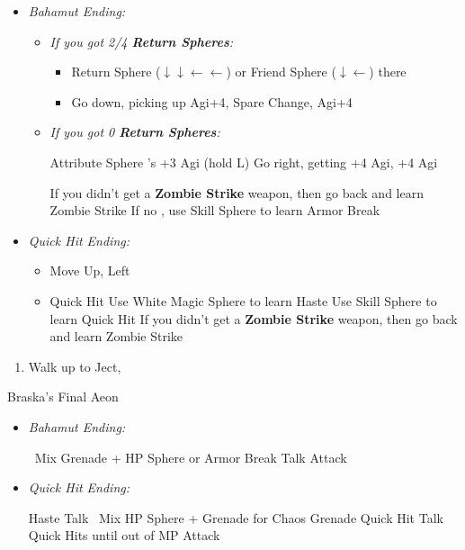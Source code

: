 \begin{spheregrid}
\begin{itemize}
	\item \textit{Bahamut Ending:}
	\begin{itemize}
		\item \textit{If you got 2/4 \textbf{Return Spheres}:}
		\begin{itemize}
			\yunaf Attribute Sphere \rikku's +3 Agi (hold L)
			\item Return Sphere ($\downarrow \downarrow \leftarrow \leftarrow$) or Friend Sphere ($\downarrow \leftarrow$) there
			\item Go down, picking up Agi+4, Spare Change, Agi+4
		\end{itemize}
		\item \textit{If you got 0 \textbf{Return Spheres}:}
		\begin{itemize}
			\yunaf Attribute Sphere \rikku's +3 Agi (hold L)
			\yunaf Go right, getting +4 Agi, +4 Agi
		\end{itemize}
		\tidusf If you didn't get a \textbf{Zombie Strike} weapon, then go back and learn Zombie Strike
		\rikkuf If no \od, use Skill Sphere to learn Armor Break
	\end{itemize}
	\item \textit{Quick Hit Ending:}
	\begin{itemize}
		\rikkuf Unlock Level 2 Key Sphere
		\item Move Up, Left
		\item Quick Hit
		\yunaf Use White Magic Sphere to learn Haste
		\yunaf Use Skill Sphere to learn Quick Hit
		\tidusf If you didn't get a \textbf{Zombie Strike} weapon, then go back and learn Zombie Strike
	\end{itemize}
\end{itemize}
\end{spheregrid}
\begin{enumerate}[resume]
	\item Walk up to Ject, \cs[4:30]
\end{enumerate}
\begin{battle}[180000]{Braska's Final Aeon}
\begin{itemize}
	\item \textit{Bahamut Ending:}
	\begin{itemize}
		\switch{\yuna}{\rikku}
		\rikkuf \od\ Mix Grenade + HP Sphere or Armor Break
		\tidusf Talk
		\switch{\auron}{\yuna}
		\summon{\bahamut}
		\bahamutf Attack
	\end{itemize}
	\item \textit{Quick Hit Ending:}
	\begin{itemize}
		\yunaf Haste \yuna
		\tidusf Talk
		\switch{\auron}{\rikku}
		\rikkuf \od\ Mix HP Sphere + Grenade for Chaos Grenade
		\yunaf Quick Hit
		\tidusf Talk
		\yunaf Quick Hits until out of MP
		\summon{\bahamut}
		\bahamutf Attack
	\end{itemize}
\end{itemize}
\end{battle}
